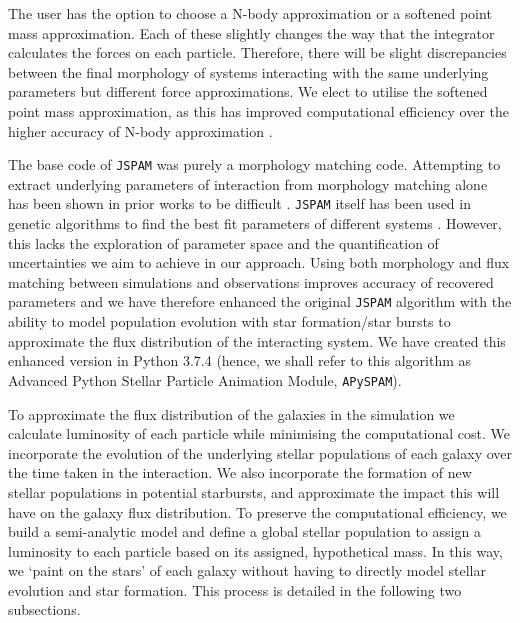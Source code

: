 The user has the option to choose a N-body approximation or a softened point mass approximation. Each of these slightly changes the way that the integrator calculates the forces on each particle. Therefore, there will be slight discrepancies between the final morphology of systems interacting with the same underlying parameters but different force approximations. We elect to utilise the softened point mass approximation, as this has improved computational efficiency over the higher accuracy of N-body approximation \citep[for more on this see][]{2016A&C....16...26W}. 

The base code of \texttt{JSPAM} was purely a morphology matching code. Attempting to extract underlying parameters of interaction from morphology matching alone has been shown in prior works to be difficult \citep[e.g.][]{2009AJ....137.3071B}. \texttt{JSPAM} itself has been used in genetic algorithms to find the best fit parameters of different systems \citep[e.g][]{2023A&C....4200691W}. However, this lacks the exploration of parameter space and the quantification of uncertainties we aim to achieve in our approach. Using both morphology and flux matching between simulations and observations improves accuracy of recovered parameters \citep{2021ApJ...923..124M} and we have therefore enhanced the original \texttt{JSPAM} algorithm with the ability to model population evolution with star formation/star bursts to approximate the flux distribution of the interacting system. We have created this enhanced version in Python 3.7.4 (hence, we shall refer to this algorithm as Advanced Python Stellar Particle Animation Module, \texttt{APySPAM}).

To approximate the flux distribution of the galaxies in the simulation we calculate luminosity of each particle while minimising the computational cost. We incorporate the evolution of the underlying stellar populations of each galaxy over the time taken in the interaction. We also incorporate the formation of new stellar populations in potential starbursts, and approximate the impact this will have on the galaxy flux distribution. To preserve the computational efficiency, we build a semi-analytic model and define a global stellar population to assign a luminosity to each particle based on its assigned, hypothetical mass. In this way, we `paint on the stars' of each galaxy without having to directly model stellar evolution and star formation. This process is detailed in the following two subsections. 

